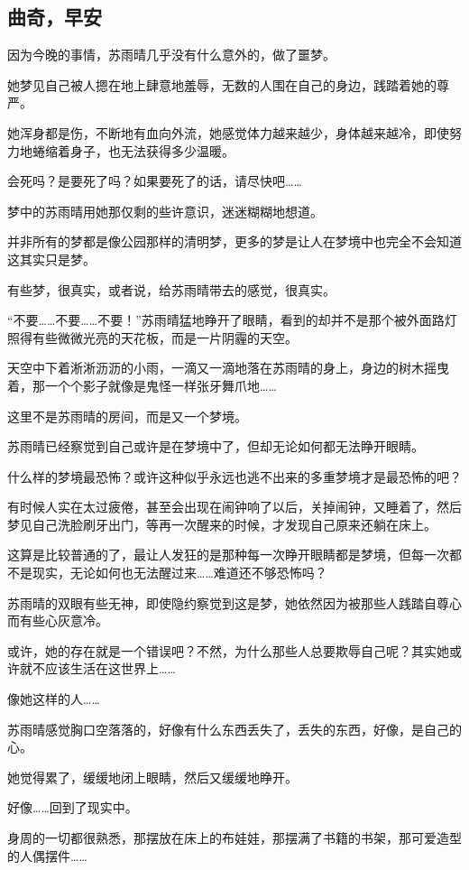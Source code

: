 \subsection{曲奇，早安}

因为今晚的事情，苏雨晴几乎没有什么意外的，做了噩梦。

她梦见自己被人摁在地上肆意地羞辱，无数的人围在自己的身边，践踏着她的尊严。

她浑身都是伤，不断地有血向外流，她感觉体力越来越少，身体越来越冷，即使努力地蜷缩着身子，也无法获得多少温暖。

会死吗？是要死了吗？如果要死了的话，请尽快吧……

梦中的苏雨晴用她那仅剩的些许意识，迷迷糊糊地想道。

并非所有的梦都是像公园那样的清明梦，更多的梦是让人在梦境中也完全不会知道这其实只是梦。

有些梦，很真实，或者说，给苏雨晴带去的感觉，很真实。

“不要……不要……不要！”苏雨晴猛地睁开了眼睛，看到的却并不是那个被外面路灯照得有些微微光亮的天花板，而是一片阴霾的天空。

天空中下着淅淅沥沥的小雨，一滴又一滴地落在苏雨晴的身上，身边的树木摇曳着，那一个个影子就像是鬼怪一样张牙舞爪地……

这里不是苏雨晴的房间，而是又一个梦境。

苏雨晴已经察觉到自己或许是在梦境中了，但却无论如何都无法睁开眼睛。

什么样的梦境最恐怖？或许这种似乎永远也逃不出来的多重梦境才是最恐怖的吧？

有时候人实在太过疲倦，甚至会出现在闹钟响了以后，关掉闹钟，又睡着了，然后梦见自己洗脸刷牙出门，等再一次醒来的时候，才发现自己原来还躺在床上。

这算是比较普通的了，最让人发狂的是那种每一次睁开眼睛都是梦境，但每一次都不是现实，无论如何也无法醒过来……难道还不够恐怖吗？

苏雨晴的双眼有些无神，即使隐约察觉到这是梦，她依然因为被那些人践踏自尊心而有些心灰意冷。

或许，她的存在就是一个错误吧？不然，为什么那些人总要欺辱自己呢？其实她或许就不应该生活在这世界上……

像她这样的人……

苏雨晴感觉胸口空落落的，好像有什么东西丢失了，丢失的东西，好像，是自己的心。

她觉得累了，缓缓地闭上眼睛，然后又缓缓地睁开。

好像……回到了现实中。

身周的一切都很熟悉，那摆放在床上的布娃娃，那摆满了书籍的书架，那可爱造型的人偶摆件……

